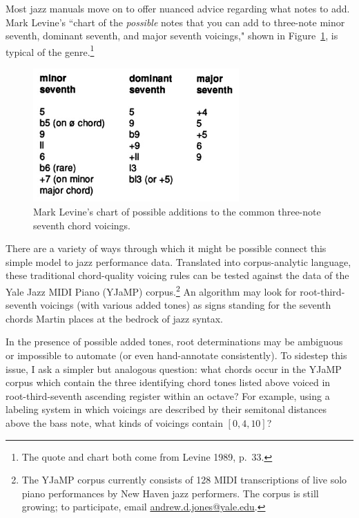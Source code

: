 Most jazz manuals move on to offer nuanced advice regarding what notes to add.  Mark Levine's ``chart of the \emph{possible} notes that you can add to three-note minor seventh, dominant seventh, and major seventh voicings," shown in Figure~\ref{levineextensions}, is typical of the genre.\footnote{The quote and chart both come from Levine 1989, p.\ 33.}
\begin{figure}
	\centering
	\includegraphics[width=3.1in]{levineextensions.jpg}
	\caption{Mark Levine's chart of possible additions to the common three-note seventh chord voicings.}
	\label{levineextensions}
\end{figure}
There are a variety of ways through which it might be possible connect this simple model to jazz performance data.  Translated into corpus-analytic language, these traditional chord-quality voicing rules can be tested against the data of the Yale Jazz MIDI Piano (YJaMP) corpus.\footnote{The YJaMP corpus currently consists of 128 MIDI transcriptions of live solo piano performances by New Haven jazz performers.  The corpus is still growing; to participate, email \href{mailto:andrew.d.jones@yale.edu}{andrew.d.jones@yale.edu}.}  An algorithm may look for root-third-seventh voicings (with various added tones) as signs standing for the seventh chords Martin places at the bedrock of jazz syntax.

In the presence of possible added tones, root determinations may be ambiguous or impossible to automate (or even hand-annotate consistently).  To sidestep this issue, I ask a simpler but analogous question: what chords occur in the YJaMP corpus which contain the three identifying chord tones listed above voiced in root-third-seventh ascending register within an octave?  For example, using a labeling system in which voicings are described by their semitonal distances above the bass note, what kinds of voicings contain $[0,4,10]$?

